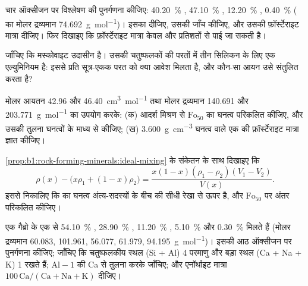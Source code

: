 \begin{exercise}[$\star\star$]\label{exo:b1:rock-forming-minerals:7}
चार ऑक्सीजन पर  विश्लेषण की पुनर्गणना कीजिए: \qty{40.20}{\percent} , \qty{47.10}{\percent} ,
\qty{12.20}{\percent} , \qty{0.40}{\percent}  ( का मोलर द्रव्यमान
\qty{74.692}{g.mol^{-1}})। इसका  दीजिए, उसकी जाँच कीजिए, और उसकी फ़ॉर्स्टेराइट मात्रा दीजिए। फिर दिखाइए
कि फ़ॉर्स्टेराइट मात्रा केवल  और  प्रतिशतों से पाई जा सकती है।
\end{exercise}

\begin{exercise}[$\star\star$]\label{exo:b1:rock-forming-minerals:8}
जाँचिए कि मस्कोवाइट  उदासीन है। उसकी चतुष्फलकों की परतों में तीन सिलिकन के लिए एक
एल्युमिनियम है: इससे प्रति सूत्र-एकक परत को क्या आवेश मिलता है, और कौन-सा आयन उसे संतुलित करता है?
\end{exercise}

\begin{exercise}[$\star\star$]\label{exo:b1:rock-forming-minerals:9}
मोलर आयतन \num{42.96} और \qty{46.40}{cm^3.mol^{-1}} तथा मोलर द्रव्यमान \num{140.691} और \qty{203.771}{g.mol^{-1}} का
उपयोग करके: (क) आदर्श मिश्रण से $\text{Fo}_{50}$ का घनत्व परिकलित कीजिए, और उसकी तुलना  घनत्वों के माध्य से
कीजिए; (ख) \qty{3.600}{g.cm^{-3}} घनत्व वाले एक  की फ़ॉर्स्टेराइट मात्रा ज्ञात कीजिए।
\end{exercise}

\begin{exercise}[$\star\star\star$]\label{exo:b1:rock-forming-minerals:10}
\cref{prop:b1:rock-forming-minerals:ideal-mixing} के संकेतन के साथ दिखाइए कि
\[
  \rho(x) - \bigl(x\rho_1 + (1 - x)\rho_2\bigr) =
  \frac{x(1 - x)(\rho_1 - \rho_2)(V_1 - V_2)}{V(x)} .
\]
इससे निकालिए कि  का घनत्व अंत्य-सदस्यों के बीच की सीधी रेखा से ऊपर है, और $\text{Fo}_{50}$ पर अंतर परिकलित कीजिए।
\end{exercise}

\begin{exercise}[$\star\star\star$]\label{exo:b1:rock-forming-minerals:11}
एक गैब्रो के एक  से \qty{54.10}{\percent} , \qty{28.90}{\percent} , \qty{11.20}{\percent} ,
\qty{5.10}{\percent}  और \qty{0.30}{\percent}  मिलते हैं (मोलर द्रव्यमान \num{60.083}, \num{101.961}, \num{56.077},
\num{61.979}, \qty{94.195}{g.mol^{-1}})। इसकी आठ ऑक्सीजन पर पुनर्गणना कीजिए; जाँचिए कि चतुष्फलकीय स्थल (Si + Al) 4 परमाणु
और बड़ा स्थल (Ca + Na + K) 1 रखते हैं; $\mathrm{Al} - 1$ की Ca से तुलना करके  जाँचिए; और एनॉर्थाइट
मात्रा $100\,\mathrm{Ca}/(\mathrm{Ca} +
\mathrm{Na} + \mathrm{K})$ दीजिए।
\end{exercise}

